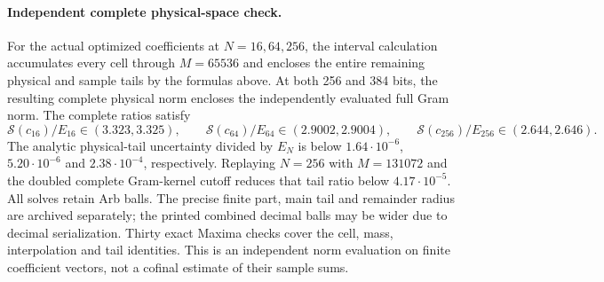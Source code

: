 \paragraph{Independent complete physical-space check.}
For the actual optimized coefficients at $N=16,64,256$, the interval
calculation accumulates every cell through $M=65536$ and encloses the
entire remaining physical and sample tails by the formulas above.
At both 256 and 384 bits, the resulting complete physical norm encloses
the independently evaluated full Gram norm. The complete ratios satisfy
\[
 \mathcal S(c_{16})/E_{16}\in(3.323,3.325),\qquad
 \mathcal S(c_{64})/E_{64}\in(2.9002,2.9004),\qquad
 \mathcal S(c_{256})/E_{256}\in(2.644,2.646).
\]
The analytic physical-tail uncertainty divided by $E_N$ is below
$1.64\cdot10^{-6}$, $5.20\cdot10^{-6}$ and $2.38\cdot10^{-4}$,
respectively. Replaying $N=256$ with $M=131072$ and the doubled complete
Gram-kernel cutoff reduces that tail ratio below $4.17\cdot10^{-5}$.
All solves retain Arb balls. The precise finite part, main tail and
remainder radius are archived separately; the printed combined decimal
balls may be wider due to decimal serialization. Thirty exact Maxima
checks cover the cell, mass, interpolation and tail identities.
This is an independent norm evaluation on finite coefficient vectors,
not a cofinal estimate of their sample sums.
